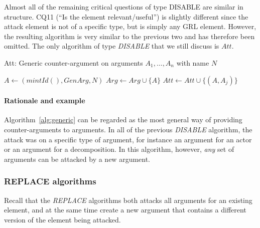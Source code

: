 Almost all of the remaining critical questions of type DISABLE are similar in structure. CQ11 (``Is the element relevant/useful'') is slightly different since the attack element is not of a specific type, but is simply any GRL element. However, the resulting algorithm is very similar to the previous two and has therefore been omitted. The only algorithm of type \emph{DISABLE} that we still discuss is $Att$.

\begin{algorithm}[h]
  \caption{Att: Generic counter-argument on arguments $A_1,\ldots,A_n$ with name $N$}\label{alg:generic}
  \begin{algorithmic}[1]
    \State $A \leftarrow (mintId(),GenArg, N)$\label{alg:generic:arg}
    \State $Arg\leftarrow Arg \cup \{A\}$\label{alg:generic:addarg}
    \label{alg:generic:for}
      \State $Att \leftarrow Att \cup \{(A,A_j)\}$\label{alg:generic:att}
    \EndFor
    \EndProcedure
  \end{algorithmic}
\end{algorithm}

\paragraph{Rationale and example} Algorithm~\ref{alg:generic} can be regarded as the most general way of providing counter-arguments to arguments. In all of the previous \emph{DISABLE} algorithm, the attack was on a specific type of argument, for instance an argument for an actor or an argument for a decomposition. In this algorithm, however, \emph{any} set of arguments can be attacked by a new argument.


\subsubsection{REPLACE algorithms}

Recall that the \emph{REPLACE} algorithms both attacks all arguments for an existing element, and at the same time create a new argument that contains a different version of the element being attacked.

